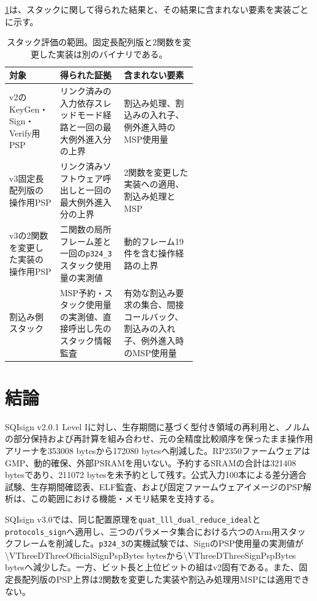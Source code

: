 \documentclass[a4paper,10pt]{ltjsarticle}
\theoremstyle{definition}
\theoremstyle{remark}
\begin{document}
\cref{tab:stack-claim-layers}は、スタックに関して得られた結果と、その結果に含まれない要素を実装ごとに示す。

\begin{table}[H]
  \centering
  \caption{スタック評価の範囲。固定長配列版と2関数を変更した実装は別のバイナリである。}
  \label{tab:stack-claim-layers}
  \footnotesize
  \begin{tabularx}{\linewidth}{@{}p{0.27\linewidth}p{0.34\linewidth}X@{}}
    \toprule
    対象 & 得られた証拠 & 含まれない要素 \\
    \midrule
    v2のKeyGen・Sign・Verify用PSP & リンク済みの入力依存スレッドモード経路と一回の最大例外進入分の上界 & 割込み処理、割込みの入れ子、例外進入時のMSP使用量 \\
    v3固定長配列版の操作用PSP & リンク済みソフトウェア呼出しと一回の最大例外進入分の上界 & 2関数を変更した実装への適用、割込み処理とMSP \\
    v3の2関数を変更した実装の操作用PSP & 二関数の局所フレーム差と一回の\texttt{p324\_3}スタック使用量の実測値 & 動的フレーム19件を含む操作経路の上界 \\
    割込み側スタック & MSP予約・スタック使用量の実測値、直接呼出し先のスタック情報監査 & 有効な割込み要求の集合、間接コールバック、割込みの入れ子、例外進入時のMSP使用量 \\
    \bottomrule
  \end{tabularx}
\end{table}

\section{結論}
\label{sec:conclusion}

SQIsign v2.0.1 Level Iに対し、生存期間に基づく型付き領域の再利用と、ノルムの部分保持および再計算を組み合わせ、元の全精度比較順序を保ったまま操作用アリーナを\num{353008} bytesから\num{172080} bytesへ削減した。RP2350ファームウェアはGMP、動的確保、外部PSRAMを用いない。予約するSRAMの合計は\num{321408} bytesであり、\num{211072} bytesを未予約として残す。公式入力100本による差分適合試験、生存期間確認表、ELF監査、および固定ファームウェアイメージのPSP解析は、この範囲における機能・メモリ結果を支持する。

SQIsign v3.0では、同じ配置原理を\texttt{quat\_lll\_dual\_reduce\_ideal}と\texttt{protocols\_sign}へ適用し、三つのパラメータ集合における六つのArm用スタックフレームを削減した。\texttt{p324\_3}の実機試験では、SignのPSP使用量の実測値が\num{\VThreeDThreeOfficialSignPspBytes} bytesから\num{\VThreeDThreeSignPspBytes} bytesへ減少した。一方、ビット長と上位ビットの組はv2固有である。また、固定長配列版のPSP上界は2関数を変更した実装や割込み処理用MSPには適用できない。
\end{document}
